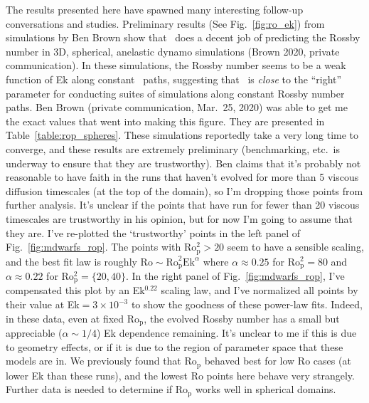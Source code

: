 The results presented here have spawned many interesting follow-up conversations and studies.
Preliminary results (See Fig.~\ref{fig:ro_ek}) from simulations by Ben Brown show that \pro$\,$ does a decent job of predicting the Rossby number in 3D, spherical, anelastic dynamo simulations (Brown 2020, private communication).
In these simulations, the Rossby number seems to be a weak function of Ek along constant \pro$\,$ paths, suggesting that \pro$\,$ is \emph{close} to the ``right'' parameter for conducting suites of simulations along constant Rossby number paths.
Ben Brown (private communication, Mar.~25, 2020) was able to get me the exact values that went into making this figure.
They are presented in Table~\ref{table:rop_spheres}.
These simulations reportedly take a very long time to converge, and these results are extremely preliminary (benchmarking, etc.~is underway to ensure that they are trustworthy).
Ben claims that it's probably not reasonable to have faith in the runs that haven't evolved for more than 5 viscous diffusion timescales (at the top of the domain), so I'm dropping those points from further analysis.
It's unclear if the points that have run for fewer than 20 viscous timescales are trustworthy in his opinion, but for now I'm going to assume that they are.
I've re-plotted the `trustworthy' points in the left panel of Fig.~\ref{fig:mdwarfs_rop}.
The points with Ro$_\text{p}^2 > 20$ seem to have a sensible scaling, and the best fit law is roughly $\text{Ro} \sim \text{Ro}_\text{p}^2 \text{Ek}^\alpha$ where $\alpha \approx 0.25$ for Ro$_\text{p}^2 = 80$ and $\alpha \approx 0.22$ for Ro$_\text{p}^2 = \{20, 40\}$.
In the right panel of Fig.~\ref{fig:mdwarfs_rop}, I've compensated this plot by an Ek$^{0.22}$ scaling law, and I've normalized all points by their value at Ek$ = 3 \times 10^{-3}$ to show the goodness of these power-law fits.
Indeed, in these data, even at fixed Ro$_\text{p}$, the evolved Rossby number has a small but appreciable ($\alpha \sim 1/4$) Ek dependence remaining.
It's unclear to me if this is due to geometry effects, or if it is due to the region of parameter space that these models are in.
We previously found that Ro$_\text{p}$ behaved best for low Ro cases (at lower Ek than these runs), and the lowest Ro points here behave very strangely.
Further data is needed to determine if Ro$_{\text{p}}$ works well in spherical domains.

